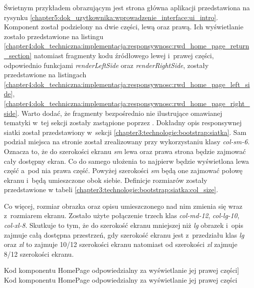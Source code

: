 \documentclass[../Kamil_Kowalewski_Main.tex]{subfiles}
\begin{document}
{{{            Świetnym przykładem obrazującym jest strona główna aplikacji przedstawiona
            na rysynku \ref{chapter5:dok_uzytkownika:wprowadzenie_interface:ui_intro}.
            Komponent został podzielony na dwie części, lewą oraz prawą. Ich wyświetlanie
            zostało przedstawione na listingu
            \ref{chapter4:dok_techniczna:implementacja:responsywnosc:rwd_home_page_return_section}
            natomiast fragmenty kodu źródłowego lewej i~prawej części, odpowiednio
            funkcjami \textit{renderLeftSide} oraz \textit{renderRightSide}, zostały
            przedstawione na listingach
            \ref{chapter4:dok_techniczna:implementacja:responsywnosc:rwd_home_page_left_side},
            \ref{chapter4:dok_techniczna:implementacja:responsywnosc:rwd_home_page_right_side}.
            Warto dodać, że fragmenty bezpośrednio nie ilustrujące omawianej tematyki
            w~tej sekcji zostały zastąpione poprzez  .
            Dokładny opis responsywnej siatki został przedstawiony w~sekcji
            \ref{chapter3:technologie:bootstrap:siatka}. Sam podział miejsca na stronie
            został zrealizowany przy wykorzystaniu klasy \textit{col-sm-6}. Oznacza to,
            że do szerokości ekranu \textit{sm} lewa oraz prawa strona będzie zajmować
            cały dostępny ekran. Co do samego ułożenia to najpierw będzie wyświetlona
            lewa część a~pod nia prawa część. Powyżej szerokości \textit{sm} będą one
            zajmować połowę ekranu i~będą umieszczone obok siebie. Definicje rozmiarów
            zostały przedstawione w tabeli
            \ref{chapter3:technologie:bootstrap:siatka:col_size}.

            Co więcej, rozmiar obrazka oraz opisu umieszczonego nad nim zmienia się wraz
            z~rozmiarem ekranu. Zostało użyte połączenie trzech klas
            \textit{col-md-12}, \textit{col-lg-10}, \textit{col-xl-8}. Skutkuje to tym,
            że do szerokość ekranu mniejszej niż \textit{lg} obrazek i~opis zajmuje
            całą dostępna przestrzeń, gdy szerokość ekranu jest z~przedziału klas
            \textit{lg} oraz \textit{xl} to zajmuje 10/12 szerokości ekranu natomiast
            od szerokości \textit{xl} zajmuje 8/12 szerokości ekranu.

            \begin{code}[H]
                
                \caption
                [Kod komponentu HomePage odpowiedzialny za wyświetlanie jej prawej części]
                {Kod komponentu HomePage odpowiedzialny za wyświetlanie jej prawej części}
                \label{chapter4:dok_techniczna:implementacja:responsywnosc:rwd_home_page_right_side}
            \end{code}

}}}
\end{document}
